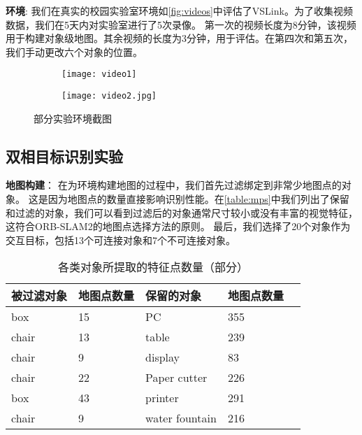 \textbf{环境}: 我们在真实的校园实验室环境如\autoref{fig:videos}中评估了VSLink。为了收集视频数据，我们在5天内对实验室进行了5次录像。
第一次的视频长度为8分钟，该视频用于构建对象级地图。其余视频的长度为3分钟，用于评估。在第四次和第五次，我们手动更改六个对象的位置。

\begin{figure}[htbp]
	\centering
	\begin{subfigure}{.49\linewidth}
		\texttt{[image: video1]}
		\caption{}
	\end{subfigure}
	\begin{subfigure}{.49\linewidth}
		\texttt{[image: video2.jpg]}
		\caption{}
	\end{subfigure}
	\caption{部分实验环境截图}\label{fig:videos}
\end{figure}

\subsection{双相目标识别实验}

\textbf{地图构建}：
在为环境构建地图的过程中，我们首先过滤绑定到非常少地图点的对象。
这是因为地图点的数量直接影响识别性能。在\autoref{table:mps}中我们列出了保留和过滤的对象，我们可以看到过滤后的对象通常尺寸较小或没有丰富的视觉特征，这符合ORB-SLAM2\cite{mur2017orb}的地图点选择方法的原则。
最后，我们选择了20个对象作为交互目标，包括13个可连接对象和7个不可连接对象。

\begin{table}[htbp]
	\caption{各类对象所提取的特征点数量（部分）}  \label{table:mps} 
	\begin{center}  
		\begin{tabular}{|l|l|l|l| p{4cm}|}  
			\hline  
			\textbf{被过滤对象} & \textbf{地图点数量} & \textbf{保留的对象} & \textbf{地图点数量}\\ \hline  
			box & 15 & PC & 355  \\ \hline 
			chair & 13 & table & 239  \\ \hline 
			chair & 9 & display & 83  \\ \hline  
			chair & 22 & Paper cutter & 226  \\ \hline  
			box & 43 & printer & 291  \\ \hline  
			chair & 9 & water fountain & 216  \\ \hline  
		\end{tabular}  
	\end{center}  
\end{table} 

